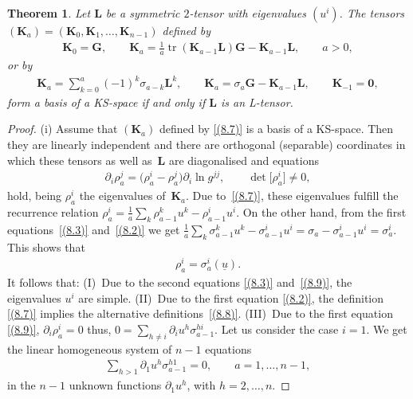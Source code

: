 \documentclass[pdftex]{sigma}
\def\bs{\boldsymbol}
\numberwithin{equation}{section}
\newtheorem{Theorem}{Theorem}[section]
 { \theoremstyle{definition}
\newtheorem{Notation}[Theorem]{Notation}
\newtheorem{Example}[Theorem]{Example}
\newtheorem{Remark}[Theorem]{Remark}
\newtheorem{Remarks}[Theorem]{Remarks}
 }
\begin{document}
\begin{Theorem}\label{t:8.1}
Let $\bs L$ be a symmetric $2$-tensor with eigenvalues $(u^i)$. The tensors $(\bs K_a)=(\bs K_0,\bs K_1,\ldots,\bs K_{n-1})$ defined by
\begin{gather}
\bs K_0=\bs G,\qquad
\bs K_a=\tfrac 1a \operatorname{tr}(\bs K_{a-1}\bs L)\bs G-\bs K_{a-1}\bs L, \qquad { {a>0}},
\label{(8.7)}
\end{gather}
or by
\begin{gather}
\bs K_a=\sum_{k=0}^a (-1)^k\sigma_{a-k}\bs L^k, \qquad \bs K_a=\sigma_a \bs G-\bs K_{a-1}\bs L, \qquad \bs K_{-1}=\bs 0,
\label{(8.8)}
\end{gather}
form a basis of a KS-space if and only if $\bs L$ is an L-tensor.
\end{Theorem}

\begin{proof}
(i) Assume that $(\bs K_a)$ def\/ined by \eqref{(8.7)} is a basis of a KS-space. Then they are linearly independent and there are orthogonal (separable) coordinates in which these tensors as well as~$\bs L$ are diagonalised and equations
\begin{gather}
\partial_i\rho_a^j=\big(\rho_a^i-\rho_a^j\big) \partial_i\ln g^{jj},\qquad \det\big[\rho_a^i\big]\neq 0,
\label{(8.9)}
\end{gather}
hold, being $\rho_a^i$ the eigenvalues of~$\bs K_a$. Due to~\eqref{(8.7)}, these eigenvalues fulf\/ill the recurrence relation
$\rho_a^i=\tfrac 1a \sum_k\rho_{a-1}^ku^k-\rho_{a-1}^i u^i$. On the other hand, from the f\/irst equations~\eqref{(8.3)} and~\eqref{(8.2)} we get $\tfrac 1a \sum_k\sigma_{a-1}^k u^k-\sigma_{a-1}^i u^i=\sigma_a-\sigma_{a-1}^i u^i=\sigma_a^i$. This shows that
\begin{gather*}
\rho_a^i=\sigma_a^i(\underline u).
\end{gather*}
It follows that: (I)~Due to the second equations \eqref{(8.3)} and~\eqref{(8.9)}, the eigenvalues $u^i$ are simple. (II)~Due to the f\/irst equation \eqref{(8.2)}, the def\/inition \eqref{(8.7)} implies the alternative def\/initions~\eqref{(8.8)}. (III)~Due to the f\/irst equation \eqref{(8.9)},  $\partial_i\rho_a^i=0$ thus, $0=\sum\limits_{h\neq i}\partial_iu^h \sigma_{a-1}^{hi}$.
Let us consider the case $i=1$. We get the linear homogeneous system of $n-1$ equations
\begin{gather}
\sum_{h>1}\partial_1u^h \sigma_{a-1}^{h1}=0, \qquad a=1,\ldots,n-1,
\label{(8.10)}
\end{gather}
in the $n-1$ unknown functions $\partial_1u^h$, with $h=2,\ldots,n$.

\end{proof}
\end{document}

